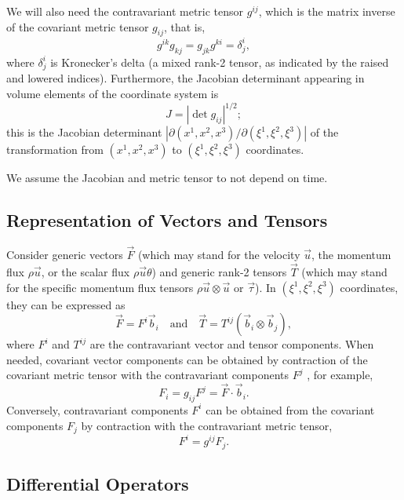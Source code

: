 \documentclass{report}
\begin{document}
We will also need the contravariant metric tensor $g^{ij}$, which is the matrix inverse of the covariant metric tensor $g_{ij}$, that is, 
\[
g^{ik} g_{kj} = g_{jk} g^{ki} = \delta^i_j,
\]
where $\delta^i_j$ is Kronecker's delta (a mixed rank-2 tensor, as indicated by the raised and lowered indices). Furthermore, the Jacobian determinant appearing in volume elements of the coordinate system is
\begin{equation}
    J = |\det g_{ij}|^{1/2};
\end{equation}
this is the Jacobian determinant $|\partial (x^1, x^2, x^3)/\partial (\xi^1, \xi^2, \xi^3)|$ of the transformation from $(x^1, x^2, x^3)$ to $(\xi^1, \xi^2, \xi^3)$ coordinates.

We assume the Jacobian and metric tensor to not depend on time.

\subsection{Representation of Vectors and Tensors}

Consider generic vectors $\vec{F}$ (which may stand for the velocity $\vec{u}$, the momentum flux $\rho \vec{u}$, or the scalar flux $\rho \vec{u} \theta$) and generic rank-2 tensors $\vec{T}$ (which may stand for the specific momentum flux tensors $\rho \vec{u} \otimes \vec{u}$ or $\vec{\tau}$). In $(\xi^1, \xi^2, \xi^3)$ coordinates, they can be expressed as 
\begin{equation}\label{e:contravariant_vectors}
\vec{F} = F^i \vec{b}_i \quad \text{and} \quad \vec{T} = T^{ij} (\vec{b}_i \otimes \vec{b}_j), 
\end{equation}
where $F^i$ and $T^{ij}$ are the contravariant vector and tensor components. When needed, covariant vector components can be obtained by contraction of the covariant metric tensor with the contravariant components $F^j$ , for example,
\begin{equation}\label{e:covariant_components}
 F_i  = g_{ij} F^j = \vec{F} \cdot \vec{b}_i.
\end{equation}
Conversely, contravariant components $F^i$ can be obtained from the covariant components $F_j$ by contraction with the contravariant metric tensor,
\begin{equation}
 F^i  = g^{ij} F_j.
\end{equation}

\subsection{Differential Operators}
\end{document}
